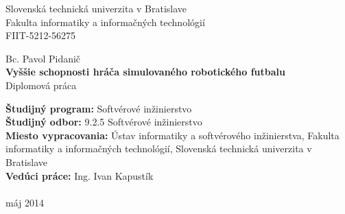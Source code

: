 
%
\begin{titlepage}
	\begin{center}
	\large Slovenská technická univerzita v Bratislave \\ \Large Fakulta informatiky a informačných technológií
	\\ \large FIIT-5212-56275
	\end{center}
	\vfill
	\begin{center}
	\Large Bc. Pavol Pidanič \\
	\LARGE \textbf{Vyššie schopnosti hráča simulovaného robotického futbalu} \\
	\large Diplomová práca
	\end{center}
	\vfill
	\small
	\textbf{Študijný program:} Softvérové inžinierstvo \\
	\textbf{Študijný odbor:} 9.2.5 Softvérové inžinierstvo \\
	\textbf{Miesto vypracovania:} Ústav informatiky a softvérového inžinierstva, Fakulta informatiky a informačných technológií, Slovenská technická univerzita v Bratislave \\
	\textbf{Vedúci práce:} Ing. Ivan Kapustík \\\\
	máj 2014
	\normalsize
\end{titlepage}
%